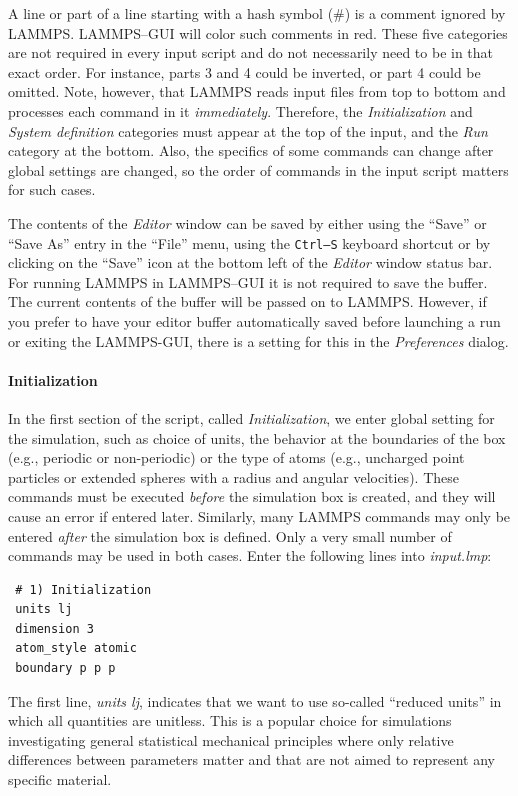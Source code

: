 \documentclass[9pt,tutorial]{livecoms}
\begin{document}
A line or part of a line starting with a hash symbol ($\#$) is a
comment ignored by LAMMPS.  LAMMPS--GUI will color such comments in red.
These five categories are not required in every input script and do not
necessarily need to be in that exact order.  For instance, parts 3 and 4
could be inverted, or part 4 could be omitted.  Note, however, that
LAMMPS reads input files from top to bottom and processes each command
in it \emph{immediately}.  Therefore, the \textit{Initialization} and
\textit{System definition} categories must appear at the top of the
input, and the \textit{Run} category at the bottom.  Also, the specifics
of some commands can change after global settings are changed, so the
order of commands in the input script matters for such cases.

The contents of the \textit{Editor} window can be saved by either using
the ``Save'' or ``Save As'' entry in the ``File'' menu, using the
\texttt{Ctrl--S} keyboard shortcut or by clicking on the ``Save'' icon
at the bottom left of the \textit{Editor} window status bar.  For
running LAMMPS in LAMMPS--GUI it is not required to save the buffer.
The current contents of the buffer will be passed on to LAMMPS.
However, if you prefer to have your editor buffer automatically saved
before launching a run or exiting the LAMMPS-GUI, there is a setting for this
in the \textit{Preferences} dialog.

\paragraph{Initialization}

In the first section of the script, called \textit{Initialization}, we
enter global setting for the simulation, such as choice of units, the
behavior at the boundaries of the box (e.g., periodic or non-periodic)
or the type of atoms (e.g., uncharged point particles or extended
spheres with a radius and angular velocities).  These commands must be
executed \emph{before} the simulation box is created, and they will
cause an error if entered later.  Similarly, many LAMMPS commands may
only be entered \emph{after} the simulation box is defined.  Only a
very small number of commands may be used in both cases.  Enter the
following lines into \textit{input.lmp}:
{\normalsize
\begin{verbatim}
 # 1) Initialization
 units lj
 dimension 3
 atom_style atomic
 boundary p p p
\end{verbatim}
}

The first line, \textit{units lj}, indicates that we want to use
so-called ``reduced units'' in which all quantities are unitless.  This
is a popular choice for simulations investigating general statistical
mechanical principles where only relative differences between
parameters matter and that are not aimed to represent any specific
material.
\end{document}

